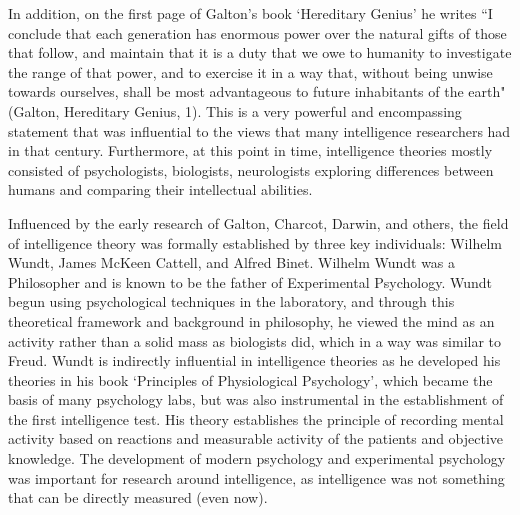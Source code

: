 \documentclass[12pt, oneside]{article}
\begin{document}
\par In addition, on the first page of Galton's book `Hereditary Genius' he writes ``I conclude that each generation has enormous power over the natural gifts of those that follow, and maintain that it is a duty that we owe to humanity to investigate the range of that power, and to exercise it in a way that, without being unwise towards ourselves, shall be most advantageous to future inhabitants of the earth" (Galton, Hereditary Genius, 1). This is a very powerful and encompassing statement that was influential to the views that many intelligence researchers had in that century. Furthermore, at this point in time, intelligence theories mostly consisted of psychologists, biologists, neurologists exploring differences between humans and comparing their intellectual abilities.

\par Influenced by the early research of Galton, Charcot, Darwin, and others, the field of intelligence theory was formally established by three key individuals: Wilhelm Wundt, James McKeen Cattell, and Alfred Binet. Wilhelm Wundt was a Philosopher and is known to be the father of Experimental Psychology. Wundt begun using psychological techniques in the laboratory, and through this theoretical framework and background in philosophy, he viewed the mind as an activity rather than a solid mass as biologists did, which in a way was similar to Freud. Wundt is indirectly influential in intelligence theories as he developed his theories in his book `Principles of Physiological Psychology', which became the basis of many psychology labs, but was also instrumental in the establishment of the first intelligence test. His theory establishes the principle of recording mental activity based on reactions and measurable activity of the patients and objective knowledge. The development of modern psychology and experimental psychology was important for research around intelligence, as intelligence was not something that can be directly measured (even now).
\end{document}
